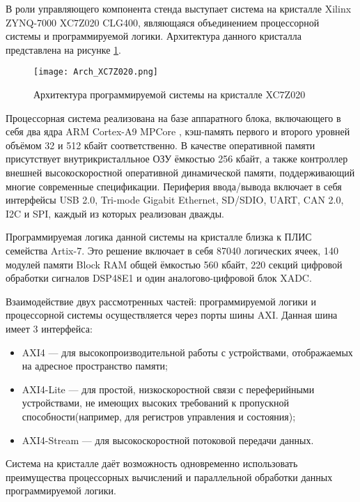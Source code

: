 В роли управляющего компонента стенда выступает система на кристалле Xilinx ZYNQ-7000 XC7Z020 CLG400, являющаяся объединением процессорной системы и программируемой логики. Архитектура данного кристалла представлена на рисунке \ref{fig:Arch_XC7Z020}.\par
\begin{figure}[ht]
    \centering
    \texttt{[image: Arch\_XC7Z020.png]}
    \caption{Архитектура программируемой системы на кристалле XC7Z020}
    \label{fig:Arch_XC7Z020}
\end{figure}
Процессорная система реализована на базе аппаратного блока, включающего в себя два ядра ARM Cortex-A9 MPCore \parencite{Cortex-A9}, кэш-память первого и второго уровней объёмом 32 и 512 кбайт соответственно. В качестве оперативной памяти присутствует внутрикристалльное ОЗУ ёмкостью 256 кбайт, а также контроллер внешней высокоскоростной оперативной динамической памяти, поддерживающий многие современные спецификации. Периферия ввода/вывода включает в себя интерфейсы USB 2.0, Tri-mode Gigabit Ethernet, SD/SDIO, UART, CAN 2.0, I2C и SPI, каждый из которых реализован дважды.\par
Программируемая логика данной системы на кристалле близка к ПЛИС семейства Artix-7. Это решение включает в себя 87040 логических ячеек, 140 модулей памяти Block RAM общей ёмкостью 560 кбайт, 220 секций цифровой обработки сигналов DSP48E1 и один аналогово-цифровой блок XADC.\par
Взаимодействие двух рассмотренных частей: программируемой логики и процессорной системы осуществляется через порты шины AXI. Данная шина имеет 3 интерфейса:
\begin{itemize}
    \item AXI4 --- для высокопроизводительной работы с устройствами, отображаемых на адресное пространство памяти;
    \item AXI4-Lite --- для простой, низкоскоростной связи с переферийными устройствами, не имеющих высоких требований к пропускной способности(например, для регистров управления и состояния);
    \item AXI4-Stream --- для высокоскоростной потоковой передачи данных.
\end{itemize}\par
Система на кристалле даёт возможность одновременно использовать преимущества процессорных вычислений и параллельной обработки данных программируемой логики.
